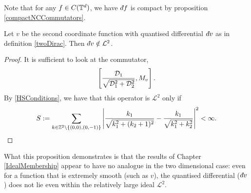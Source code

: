 Note that for any $f \in C(\mathbb{T}^d)$, we have $\qd f$ is compact
by proposition \ref{compactNCCommutators}.



\begin{proposition}
    Let $v$ be the second coordinate function with quantised differential
    $\qd v$ as in definition \ref{twoDirac}. Then $\qd v \notin \mathcal{L}^2$.
\end{proposition}
\begin{proof}
    It is sufficient to look at the commutator,
    \begin{equation}
        \left[\frac{\mathcal{D}_1}{\sqrt{\mathcal{D}_1^2+\mathcal{D}_2^2}},M_v\right].
    \end{equation}
    By \ref{HSConditions}, we have that this operator is $\mathcal{L}^2$
     only if
    \begin{equation}
        S := \sum_{k\in\mathbb{Z}^2\setminus \{(0,0),(0,-1)\}} \left|\frac{k_1}{\sqrt{k_1^2+(k_2+1)^2}}-\frac{k_1}{\sqrt{k_1^2+k_2^2}}\right|^2 < \infty.
    \end{equation}
    
\end{proof}
What this proposition demonstrates is that the results
of Chapter \ref{IdealMembership} appear to have no analogue
in the two dimensional case: even for a function that is extremely smooth (such as
$v$), the quantised differential ($\qd v$) does not lie even within
the relatively large ideal $\mathcal{L}^2$. 


